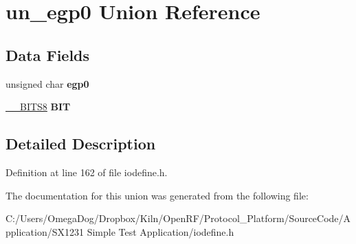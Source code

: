 \hypertarget{unionun__egp0}{\section{un\-\_\-egp0 Union Reference}
\label{unionun__egp0}
}
\subsection*{Data Fields}
\begin{DoxyCompactItemize}
\item 
\hypertarget{unionun__egp0_a7de7e2c2bc5df0d959e3c1ac810999f6}{unsigned char {\bfseries egp0}}\label{unionun__egp0_a7de7e2c2bc5df0d959e3c1ac810999f6}

\item 
\hypertarget{unionun__egp0_a438b3edb2df2d32d1436198c0bc56272}{\hyperlink{struct_____b_i_t_s8}{\-\_\-\-\_\-\-B\-I\-T\-S8} {\bfseries B\-I\-T}}\label{unionun__egp0_a438b3edb2df2d32d1436198c0bc56272}

\end{DoxyCompactItemize}


\subsection{Detailed Description}


Definition at line 162 of file iodefine.\-h.



The documentation for this union was generated from the following file\-:\begin{DoxyCompactItemize}
\item 
C\-:/\-Users/\-Omega\-Dog/\-Dropbox/\-Kiln/\-Open\-R\-F/\-Protocol\-\_\-\-Platform/\-Source\-Code/\-Application/\-S\-X1231 Simple Test Application/iodefine.\-h\end{DoxyCompactItemize}

